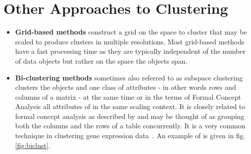 \section{Other Approaches to Clustering}\label{\positionnumber}
\begin{itemize}
    \item \textbf{Grid-based methods} construct a grid on the space to cluster that may be scaled to produce clusters in multiple resolutions. Most grid-based methods have a fast processing time as they are typically independent of the number of data objects but rather on the space the objects span.
    
    \item \textbf{Bi-clustering methods} sometimes also referred to as subspace clustering clusters the objects and one class of attributes - in other words rows and columns of a matrix - at the same time or in the terms of Formal Concept Analysis all attributes of in the same scaling context. It is closely related to formal concept analysis as described by\cite{ignatov2012concept} and may be thought of as grouping both the columns and the rows of a table concurrently. It is a very common technique in clustering gene expression data~\cite{PONTES2015163}. An example of is given in fig. \ref{fig:biclust}. 


\end{itemize}
